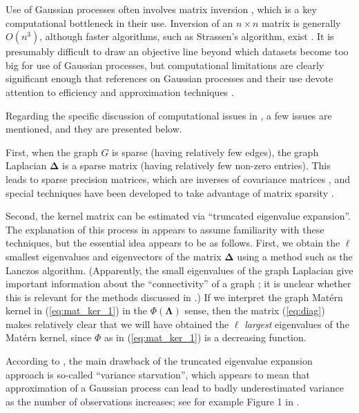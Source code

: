 Use of Gaussian processes often involves matrix inversion \cite{banerjee2013efficient, liu2020gaussian}, which is a key computational bottleneck in their use. Inversion of an $n \times n$ matrix is generally $O(n^3)$, although faster algorithms, such as Strassen's algorithm, exist \cite{clrs}. It is presumably difficult to draw an objective line beyond which datasets become too big for use of Gaussian processes, but computational limitations are clearly significant enough that references on Gaussian processes and their use devote attention to efficiency and approximation techniques \cite{rw,garnett_bayesoptbook_2023}.

Regarding the specific discussion of computational issues in \cite{pmlr-v130-borovitskiy21a}, a few issues are mentioned, and they are presented below.

First, when the graph $G$ is sparse (having relatively few edges), the graph Laplacian $\bm \Delta$ is a sparse matrix (having relatively few non-zero entries). This leads to sparse precision matrices, which are inverses of covariance matrices \cite{garnett_bayesoptbook_2023}, and special techniques have been developed to take advantage of matrix sparsity \cite{golubvanloan}. 

Second, the kernel matrix can be estimated via ``truncated eigenvalue expansion''. The explanation of this process in \cite{pmlr-v130-borovitskiy21a} appears to assume familiarity with these techniques, but the essential idea appears to be as follows. First, we obtain the $\ell$ smallest eigenvalues and eigenvectors of the matrix $\bm \Delta$ using a method such as the Lanczos algorithm. (Apparently, the small eigenvalues of the graph Laplacian give important information about the ``connectivity'' of a graph \cite{cook}; it is unclear whether this is relevant for the methods discussed in \cite{pmlr-v130-borovitskiy21a}.) If we interpret the graph Mat\'{e}rn kernel in (\ref{eq:mat_ker_1}) in the $\Phi(\bm \Lambda)$ sense, then the matrix (\ref{eq:diag}) makes relatively clear that we will have obtained the $\ell$ \textit{largest} eigenvalues of the Mat\'{e}rn kernel, since $\Phi$ as in (\ref{eq:mat_ker_1}) is a decreasing function. %

According to \cite{pmlr-v130-borovitskiy21a}, the main drawback of the truncated eigenvalue expansion approach is so-called ``variance starvation'', which appears to mean that approximation of a Gaussian process can lead to badly underestimated variance as the number of observations increases; see for example Figure 1 in \cite{wang2018batched}.

